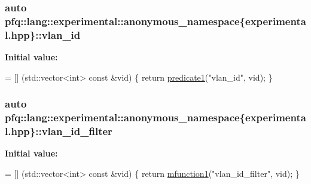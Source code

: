 \hypertarget{namespacepfq_1_1lang_1_1experimental_1_1anonymous__namespace_02experimental_8hpp_03_a4e8b14391fca933cd93cda6cac4a3568}{
\subsubsection[{vlan\+\_\+id}]{\setlength{\rightskip}{0pt plus 5cm}auto pfq\+::lang\+::experimental\+::anonymous\+\_\+namespace\{experimental.\+hpp\}\+::vlan\+\_\+id}}\label{namespacepfq_1_1lang_1_1experimental_1_1anonymous__namespace_02experimental_8hpp_03_a4e8b14391fca933cd93cda6cac4a3568}
{\bfseries Initial value\+:}
\begin{DoxyCode}
= [] (std::vector<int> \textcolor{keyword}{const} &vid) \{
                                \textcolor{keywordflow}{return} \hyperlink{namespacepfq_1_1lang_a3e018f096545ca95a68e67027c8e3144}{predicate1}(\textcolor{stringliteral}{"vlan\_id"}, vid);
                       \}
\end{DoxyCode}
\hypertarget{namespacepfq_1_1lang_1_1experimental_1_1anonymous__namespace_02experimental_8hpp_03_afc5cfa4a81358cb097a39b3dd7246586}{
\subsubsection[{vlan\+\_\+id\+\_\+filter}]{\setlength{\rightskip}{0pt plus 5cm}auto pfq\+::lang\+::experimental\+::anonymous\+\_\+namespace\{experimental.\+hpp\}\+::vlan\+\_\+id\+\_\+filter}}\label{namespacepfq_1_1lang_1_1experimental_1_1anonymous__namespace_02experimental_8hpp_03_afc5cfa4a81358cb097a39b3dd7246586}
{\bfseries Initial value\+:}
\begin{DoxyCode}
= [] (std::vector<int> \textcolor{keyword}{const} &vid) \{
                                    \textcolor{keywordflow}{return} \hyperlink{namespacepfq_1_1lang_a68d775c68562fbd0ab9ef213f2519499}{mfunction1}(\textcolor{stringliteral}{"vlan\_id\_filter"}, vid);
                              \}
\end{DoxyCode}

